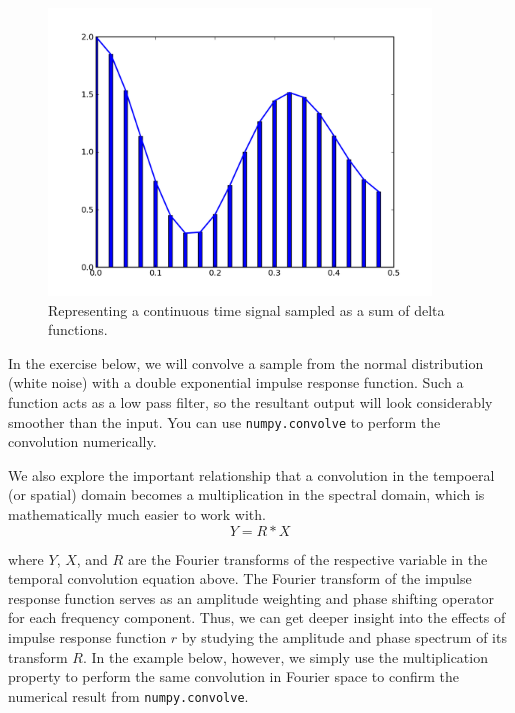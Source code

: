 \begin{center}%
\begin{figure}
\begin{centering}\includegraphics[width=4in]{fig/convolve_deltas}\par\end{centering}
\caption{\label{fig:convolve_deltas}Representing a continuous time signal sampled as a sum of delta functions.}
\end{figure}
\par\end{center}


In the exercise below, we will convolve a sample from the normal
distribution (white noise) with a double exponential impulse response
function.  Such a function acts as a low pass filter, so the resultant
output will look considerably smoother than the input.  You can use
\texttt{numpy.convolve} to perform the convolution numerically.

We also explore the important relationship that a convolution in the
tempoeral (or spatial) domain becomes a multiplication in the spectral
domain, which is mathematically much easier to work with.  
\[
Y = R*X
\] 

where $Y$, $X$, and $R$ are the Fourier transforms of the respective
variable in the temporal convolution equation above.  The Fourier
transform of the impulse response function serves as an amplitude
weighting and phase shifting operator for each frequency component.
Thus, we can get deeper insight into the effects of impulse response
function $r$ by studying the amplitude and phase spectrum of its
transform $R$.  In the example below, however, we simply use the
multiplication property to perform the same convolution in Fourier
space to confirm the numerical result from \texttt{numpy.convolve}.

